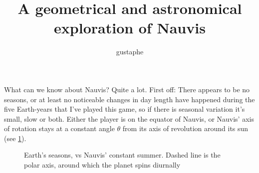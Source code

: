 \documentclass[a4paper]{article}
\title{A geometrical and astronomical exploration of Nauvis}
\author{gustaphe}
\def\thetaangle{17}
\begin{document}
\maketitle

What can we know about Nauvis? Quite a lot. First off: There appears to be no seasons, or at least no noticeable changes in day length have happened during the five Earth-years that I've played this game, so if there is seasonal variation it's small, slow or both. Either the player is on the equator of Nauvis, or Nauvis' axis of rotation stays at a constant angle \(\theta\) from its axis of revolution around its sun (see \cref{fig:seasons}).


\begin{figure}
	\centering
	\caption{Earth's seasons, vs Nauvis' constant summer. Dashed line is the polar axis, around which the planet spins diurnally}\label{fig:seasons}
\end{figure}
\end{document}

